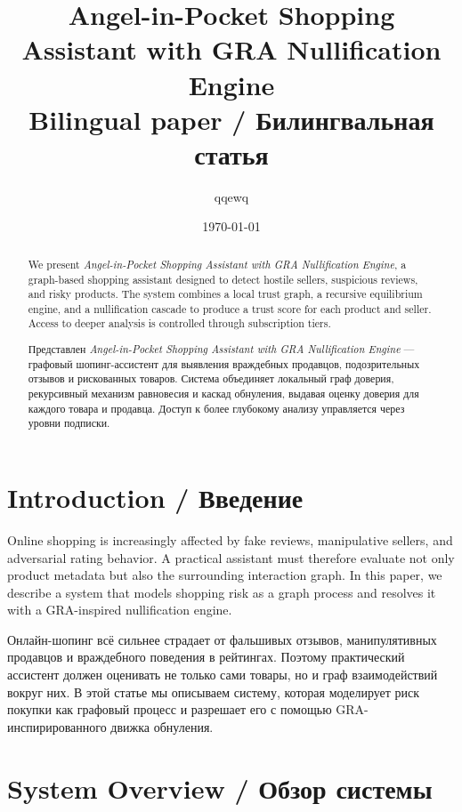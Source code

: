 \documentclass[12pt,a4paper]{article}
\title{Angel-in-Pocket Shopping Assistant with GRA Nullification Engine\\
\large Bilingual paper / Билингвальная статья}
\author{qqewq}
\date{\today}
\begin{document}
\maketitle

\begin{abstract}
We present \textit{Angel-in-Pocket Shopping Assistant with GRA Nullification Engine}, a graph-based shopping assistant designed to detect hostile sellers, suspicious reviews, and risky products. The system combines a local trust graph, a recursive equilibrium engine, and a nullification cascade to produce a trust score for each product and seller. Access to deeper analysis is controlled through subscription tiers.

Представлен \textit{Angel-in-Pocket Shopping Assistant with GRA Nullification Engine} — графовый шопинг-ассистент для выявления враждебных продавцов, подозрительных отзывов и рискованных товаров. Система объединяет локальный граф доверия, рекурсивный механизм равновесия и каскад обнуления, выдавая оценку доверия для каждого товара и продавца. Доступ к более глубокому анализу управляется через уровни подписки.
\end{abstract}

\section{Introduction / Введение}

Online shopping is increasingly affected by fake reviews, manipulative sellers, and adversarial rating behavior. A practical assistant must therefore evaluate not only product metadata but also the surrounding interaction graph. In this paper, we describe a system that models shopping risk as a graph process and resolves it with a GRA-inspired nullification engine.

Онлайн-шопинг всё сильнее страдает от фальшивых отзывов, манипулятивных продавцов и враждебного поведения в рейтингах. Поэтому практический ассистент должен оценивать не только сами товары, но и граф взаимодействий вокруг них. В этой статье мы описываем систему, которая моделирует риск покупки как графовый процесс и разрешает его с помощью GRA-инспирированного движка обнуления.

\section{System Overview / Обзор системы}
\end{document}

